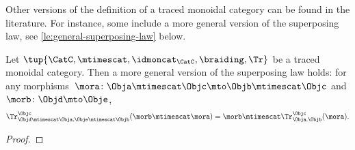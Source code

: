 \begin{remark}
Other versions of the definition of a traced monoidal category can be found in the literature. For instance, some include a more general version of the superposing law, see \cref{le:general-superposing-law} below. 
\end{remark}

\begin{lemma}\label{le:general-superposing-law}
Let $\tup{\CatC,\mtimescat,\idmoncat_{\CatC}, \braiding, \Tr}$ be a traced monoidal category. Then a more general version 
of the superposing law holds: for any morphisms~$\mora\colon \Obja\mtimescat \Objc \mto \Objb \mtimescat \Objc$ and $\morb \colon \Objd \mto \Obje$, 
\begin{equation}
            \label{eq:superposing}
            \Tr_{\Objd\mtimescat \Obja,\Obje\mtimescat \Objb}^{\Objc}(\morb \mtimescat \mora)=\morb \mtimescat \Tr_{\Obja,\Objb}^\Objc(\mora).
        \end{equation}
\end{lemma}

\begin{proof}
\end{proof}
